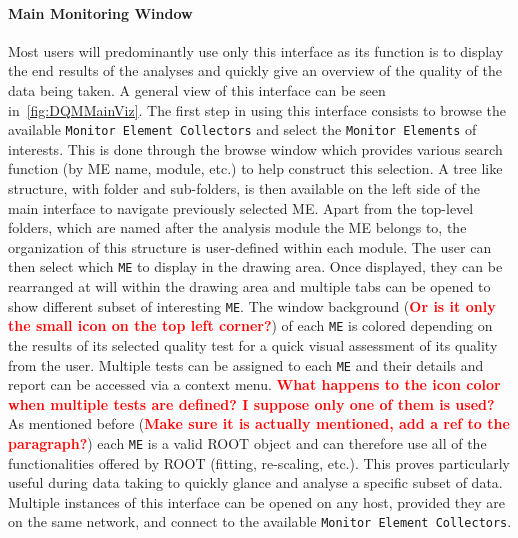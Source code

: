\documentclass{webofc}
\begin{document}
\paragraph{Main Monitoring Window}\label{par:MainGUI}

Most users will predominantly use only this interface as its function is to display the end results of the analyses and quickly give an overview of the quality of the data being taken.
A general view of this interface can be seen in~\autoref{fig:DQMMainViz}.
The first step in using this interface consists to browse the available \texttt{Monitor Element Collectors} and select the \texttt{Monitor Elements} of interests.
This is done through the browse window which provides various search function (by ME name, module, etc.) to help construct this selection.
A tree like structure, with folder and sub-folders, is then available on the left side of the main interface to navigate previously selected ME.
Apart from the top-level folders, which are named after the analysis module the ME belongs to, the organization of this structure is user-defined within each module. 
The user can then select which \texttt{ME} to display in the drawing area. Once displayed, they can be rearranged at will within the drawing area and multiple tabs can be opened to show different subset of interesting \texttt{ME}. 
The window background (\textcolor{red}{\textbf{Or is it only the small icon on the top left corner?}}) of each \texttt{ME} is colored depending on the results of its selected quality test for a quick visual assessment of its quality from the user.
Multiple tests can be assigned to each \texttt{ME} and their details and report can be accessed via a context menu. \textcolor{red}{\textbf{What happens to the icon color when multiple tests are defined? I suppose only one of them is used?}}
As mentioned before (\textcolor{red}{\textbf{Make sure it is actually mentioned, add a ref to the paragraph?}}) each \texttt{ME} is a valid ROOT object and can therefore use all of the functionalities offered by ROOT (fitting, re-scaling, etc.).
This proves particularly useful during data taking to quickly glance and analyse a specific subset of data. 
Multiple instances of this interface can be opened on any host, provided they are on the same network, and connect to the available \texttt{Monitor Element Collectors}. 
\end{document}
